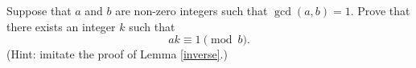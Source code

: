 Suppose that $a$ and $b$ are non-zero integers such that $\gcd(a, b) = 1$. Prove that there exists an integer $k$ such that 
\[ak \equiv 1 \pmod{b}.\]
(Hint: imitate the proof of Lemma \ref{inverse}.)